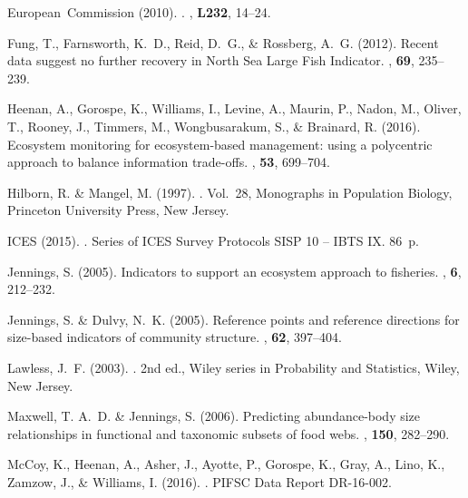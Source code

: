 \documentclass[12pt, letter]{article}
\begin{document}
\begin{thebibliography}{}
{European~Commission} (2010).
.
, {\bf L232}, 14--24.

Fung, T., Farnsworth, K.~D., Reid, D.~G., \& Rossberg, A.~G. (2012).
\newblock Recent data suggest no further recovery in {N}orth {S}ea {L}arge
  {F}ish {I}ndicator.
, {\bf 69}, 235--239.

Heenan, A., Gorospe, K., Williams, I., Levine, A., Maurin, P., Nadon, M.,
  Oliver, T., Rooney, J., Timmers, M., Wongbusarakum, S., \& Brainard, R.
  (2016).
\newblock Ecosystem monitoring for ecosystem-based management: using a
  polycentric approach to balance information trade-offs.
, {\bf 53}, 699--704.

Hilborn, R. \& Mangel, M. (1997).
.
\newblock Vol.~28, Monographs in Population Biology, Princeton University
  Press, New Jersey.

ICES (2015).
.
\newblock Series of ICES Survey Protocols SISP 10 -- IBTS IX. 86~p.

Jennings, S. (2005).
\newblock Indicators to support an ecosystem approach to fisheries.
, {\bf 6}, 212--232.

Jennings, S. \& Dulvy, N.~K. (2005).
\newblock Reference points and reference directions for size-based indicators
  of community structure.
, {\bf 62}, 397--404.

Lawless, J.~F. (2003).
.
\newblock 2nd ed., Wiley series in Probability and Statistics, Wiley, New
  Jersey.

Maxwell, T. A.~D. \& Jennings, S. (2006).
\newblock Predicting abundance-body size relationships in functional and
  taxonomic subsets of food webs.
, {\bf 150}, 282--290.

McCoy, K., Heenan, A., Asher, J., Ayotte, P., Gorospe, K., Gray, A., Lino, K.,
  Zamzow, J., \& Williams, I. (2016).
.
\newblock PIFSC Data Report DR-16-002.


\end{thebibliography}
\end{document}
